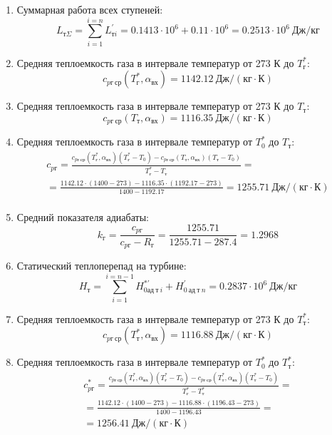\documentclass[a4paper,10pt]{article}
\begin{document}
    
    \begin{enumerate}

        \item Суммарная работа всех ступеней:
        \[
            L_{т\Sigma} = \sum_{i=1}^{i=n}{L_{тi}^{\prime}} =
            0.1413\cdot 10^6+0.11\cdot 10^6 = 0.2513 \cdot 10^6 \ Дж/кг
        \]

        \item Средняя теплоемкость газа в интервале температур от 273 К до $T_г^*$:
        \[
            c_{pг\ ср} (T_г^*, \alpha_{вх}) =
            1142.12 \ Дж/(кг \cdot К)
        \]

        \item Средняя теплоемкость газа в интервале температур от 273 К до $T_т$:
        \[
            c_{pг\ ср} (T_т, \alpha_{вх}) =
            1116.35 \ Дж/(кг \cdot К)
        \]

        \item Средняя теплоемкость газа в интервале температур от $T_0^*$ до $T_т$:
        \begin{gather*}
            c_{pг} = \frac{
		         c_{pг\ ср} (T_г^*, \alpha_{вх}) (T_г^* - T_0) - c_{pг\ ср} (T_{т}, \alpha_{вх})(T_т - T_0)
		    }{
		        T_г^* - T_т} =\\
            =\frac{
                1142.12 \cdot
                (1400 - 273) -
		        1116.35 \cdot
                (1192.17 - 273)
		    }{
		        1400 - 1192.17} =
		    1255.71 \ Дж / (кг \cdot К)\\
        \end{gather*}

        \item Средний показателя адиабаты:
        \[
            k_г = \frac{c_{pг}}{c_{pг} - R_г} =
                \frac{
                    1255.71
                }{
                    1255.71 - 287.4
                }
            = 1.2968
        \]

        \item Статический теплоперепад на турбине:
        \[
            H_т = \sum_{i=1}^{i=n-1}H_{0ад\ т\ i}^{*\prime} + H_{0\ ад\ т\ n}^\prime =
            0.2837 \cdot 10^6 \ Дж/кг
        \]

        \item Средняя теплоемкость газа в интервале температур от 273 К до $T_т^*$:
        \[
            c_{pг\ ср} (T_т^*, \alpha_{вх}) =
            1116.88 \ Дж/(кг \cdot К)
        \]

        \item Средняя теплоемкость газа в интервале температур от $T_0^*$ до $T_т^*$:
        \begin{gather*}
            c_{pг}^* = \frac{
		         c_{pг\ ср} (T_г^*, \alpha_{вх}) (T_г^* - T_0) - c_{pг\ ср} (T_т^*, \alpha_{вх})(T_т^* - T_0)
		    }{
		        T_г^* - T_т^*} =\\
            =\frac{
                1142.12 \cdot
                (1400 - 273) -
		        1116.88 \cdot
                (1196.43 - 273)
		    }{
		        1400 - 1196.43} =\\
		     = 1256.41 \ Дж / (кг \cdot К)\\
        \end{gather*}


\end{enumerate}
\end{document}
